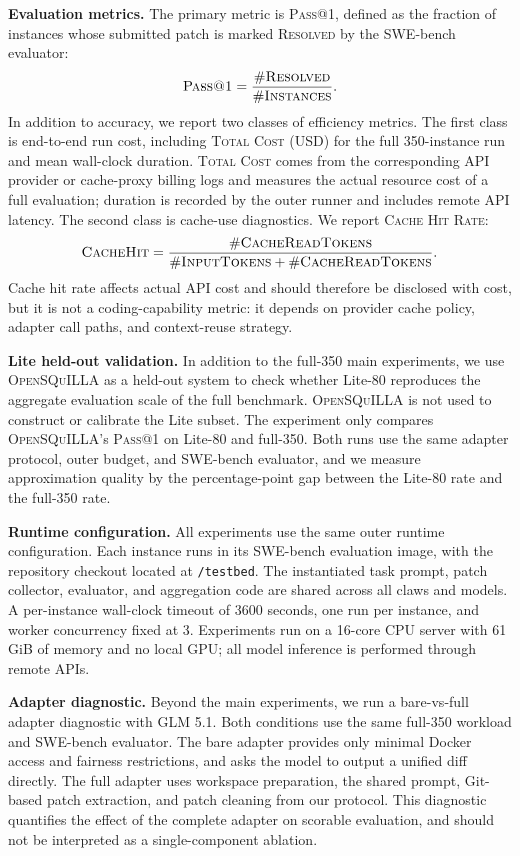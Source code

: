 \documentclass{llmxive}
\begin{document}
\textbf{Evaluation metrics.}
The primary metric is \textsc{Pass@1}, defined as the fraction of instances whose submitted patch is marked \textsc{Resolved} by the SWE-bench evaluator:
\[
\textsc{Pass@1} = \frac{\#\textsc{Resolved}}{\#\textsc{Instances}}.
\]
In addition to accuracy, we report two classes of efficiency metrics. The first class is end-to-end run cost, including \textsc{Total Cost} (USD) for the full 350-instance run and mean wall-clock duration. \textsc{Total Cost} comes from the corresponding API provider or cache-proxy billing logs and measures the actual resource cost of a full evaluation; duration is recorded by the outer runner and includes remote API latency. The second class is cache-use diagnostics. We report \textsc{Cache Hit Rate}:
\[
\textsc{CacheHit} = \frac{\#\textsc{CacheReadTokens}}{\#\textsc{InputTokens}+\#\textsc{CacheReadTokens}}.
\]
Cache hit rate affects actual API cost and should therefore be disclosed with cost, but it is not a coding-capability metric: it depends on provider cache policy, adapter call paths, and context-reuse strategy.

\textbf{Lite held-out validation.}
In addition to the full-350 main experiments, we use \textsc{OpenSQuILLA} as a held-out system to check whether Lite-80 reproduces the aggregate evaluation scale of the full benchmark. \textsc{OpenSQuILLA} is not used to construct or calibrate the Lite subset. The experiment only compares \textsc{OpenSQuILLA}'s \textsc{Pass@1} on Lite-80 and full-350. Both runs use the same adapter protocol, outer budget, and SWE-bench evaluator, and we measure approximation quality by the percentage-point gap between the Lite-80 rate and the full-350 rate.

\textbf{Runtime configuration.}
All experiments use the same outer runtime configuration. Each instance runs in its SWE-bench evaluation image, with the repository checkout located at \texttt{/testbed}. The instantiated task prompt, patch collector, evaluator, and aggregation code are shared across all claws and models. A per-instance wall-clock timeout of 3600 seconds, one run per instance, and worker concurrency fixed at 3. Experiments run on a 16-core CPU server with 61 GiB of memory and no local GPU; all model inference is performed through remote APIs.

\textbf{Adapter diagnostic.}
Beyond the main experiments, we run a bare-vs-full adapter diagnostic with GLM 5.1. Both conditions use the same full-350 workload and SWE-bench evaluator. The bare adapter provides only minimal Docker access and fairness restrictions, and asks the model to output a unified diff directly. The full adapter uses workspace preparation, the shared prompt, Git-based patch extraction, and patch cleaning from our protocol. This diagnostic quantifies the effect of the complete adapter on scorable evaluation, and should not be interpreted as a single-component ablation.
\end{document}
